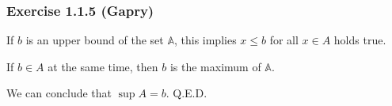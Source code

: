\subsubsection*{Exercise 1.1.5 (Gapry)}

\begin{flushleft}
If $b$ is an upper bound of the set $\mathbb{A}$, this implies $x \le b$ for all $x \in A$ holds true. 

If $b \in A$ at the same time, then $b$ is the maximum of $\mathbb{A}$.

We can conclude that $\sup A = b$. Q.E.D.
\end{flushleft}